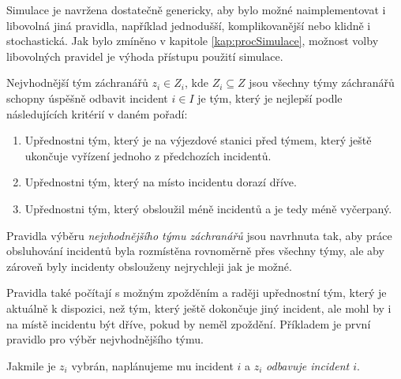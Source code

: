 Simulace je navržena dostatečně genericky, aby bylo možné naimplementovat i libovolná jiná pravidla, například jednodušší, komplikovanější nebo klidně i stochastická.
Jak bylo zmíněno v kapitole \ref{kap:procSimulace}, možnost volby libovolných pravidel je výhoda přístupu použití simulace.
\begin{definice}\label{df:simulacePravidla2}
  Nejvhodnější tým záchranářů $z_i \in Z_i$, kde $Z_i \subseteq Z$ jsou všechny týmy záchranářů schopny úspěšně odbavit incident $i \in I$ je tým,
  který je nejlepší podle následujících kritérií v daném pořadí:
  \begin{enumerate}
    \item Upřednostni tým, který je na výjezdové stanici před týmem, který ještě ukončuje vyřízení jednoho z předchozích incidentů. 
    \item Upřednostni tým, který na místo incidentu dorazí dříve. 
    \item Upřednostni tým, který obsloužil méně incidentů a je tedy méně vyčerpaný.
  \end{enumerate}
\end{definice}
Pravidla výběru \textit{nejvhodnějšího týmu záchranářů} jsou navrhnuta tak,
aby práce obsluhování incidentů byla rozmístěna rovnoměrně přes všechny týmy, ale aby zároveň byly incidenty obslouženy nejrychleji jak je možné.

Pravidla také počítají s možným zpožděním a raději upřednostní tým, který je aktuálně k dispozici, než tým, který ještě dokončuje jiný incident, ale mohl by i na místě incidentu
být dříve, pokud by neměl zpoždění. Příkladem je první pravidlo pro výběr nejvhodnějšího týmu.

Jakmile je $z_i$ vybrán, naplánujeme mu incident $i$ a $z_i$ \textit{odbavuje incident $i$}.

\clearpage


